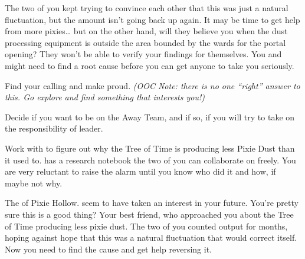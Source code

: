 \documentclass[char]{PP}
\begin{document}
The two of you kept trying to convince each other that this was just a natural fluctuation, but the amount isn’t going back up again. It may be time to get help from more pixies… but on the other hand, will they believe you when the dust processing equipment is outside the area bounded by the wards for the portal opening? They won’t be able to verify your findings for themselves. You and \cMTree{} might need to find a root cause before you can get anyone to take you seriously.
 

\begin{itemz}
	\item Find your calling and make \cSHead{} proud. \textit{(OOC Note: there is no one ``right'' answer to this. Go explore and find something that interests you!)}
	\item Decide if you want to be on the Away Team, and if so, if you will try to take on the responsibility of leader.
	\item Work with \cMTree{} to figure out why the Tree of Time is producing less Pixie Dust than it used to. \cMTree{} has a research notebook the two of you can collaborate on freely. You are very reluctant to raise the alarm until you know who did it and how, if maybe not why.
\end{itemz}

\begin{contacts}
	\contact{\cSHead{}} The \cSHead{\Majesty} of Pixie Hollow. \cSHead{\They} seem\cSHead{\plural} to have taken an interest in your future. You’re pretty sure this is a good thing?
	\contact{\cMTree{}} Your best friend, who approached you about the Tree of Time producing less pixie dust. The two of you counted output for months, hoping against hope that this was a natural fluctuation that would correct itself. Now you need to find the cause and get help reversing it.
\end{contacts}
\end{document}
